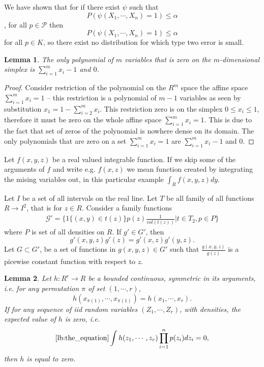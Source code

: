 \documentclass{article}
\newtheorem{lemma}{Lemma}
\begin{document}
We have shown that for if there exist $\psi$ such that 
$$P(\psi(X_1,\cdots, X_n) = 1) \leq \alpha$$,
for all $p \in \mathcal{P}$ then 
\[
 P(\psi(X_1,\cdots, X_n) = 1) \leq \alpha
\]
for all $p \in K$, so there exist no distribution for which type two error is small.  

\begin{lemma}
\label{lem:aha}
 The only polynomial of $m$ variables that is zero on the $m$-dimensional simplex is $\sum_{i=1}^m x_i-1$ and $0$.  
\end{lemma}
\begin{proof}
Consider restriction of the polynomial on the $R^m$ space  the affine space $\sum_{i=1}^m x_i=1$  -- this restriction is a polynomial of $m-1$ variables as seen by substitution $x_1 = 1 -\sum_{i=2}^m x_i$. This restriction zero is on the simplex $0 \leq x_i \leq 1$, therefore it must be zero on the whole affine space  $\sum_{i=1}^m x_i=1$. This is due to the fact that set of zeros of the polynomial is nowhere dense on its domain. The only polynomials that are zero on a set $\sum_{i=1}^m x_i=1$ are $\sum_{i=1}^m x_i-1$ and $0$.   
\end{proof}



Let $f(x,y,z)$ be a real valued integrable function. If we skip some of the arguments of $f$ and write e.g. $f(x,z)$ we mean function created by integrating the mising variables out, in this particular example $\int_{R} f(x,y,z) dy$.  


Let $I$ be a set of all intervals on the real line. Let  $T$ be all family of all functions $R \to I^2$, that is for $z \in R$. Consider a family functions
\begin{align}
 \mathcal G' = \bigg \{ 1\{ (x,y) \in t(z) \}p(z) \frac{1}{vol(t(z))} | t \in T_2 , p \in P  \bigg \} 
\end{align}
where $P$ is set of all densities on $R$. If $g' \in G'$, then 
\[
g'(x,y,z) g'(z) = g'(x,z) g'(y,z). 
\]
Let $G \subset G'$, be a set of functions in $g(x,y,z) \in G'$ such that $\frac{g(x,y,z)}{g(z)}$ is a picewise constant function with respect to $z$.


\begin{lemma}
\label{the:Lemma}
Let $h: R^r \to R$ be a bounded  continuous, symmetric in its arguments, i.e. for any permutation $\pi$ of set $(1,\cdots,r)$,
$$
h(x_{\pi(1)},\cdots,x_{\pi(1)}) = h(x_1,\cdots,x_r).   
$$
If for any sequence of iid random variables $(Z_1,\cdots,Z_r)$, with densities, the expected value of $h$ is zero, i.e.
\begin{align}
\ref{lb:the_equation}
\int h(z_1,\cdots,z_r) \prod_{i=1}^n p(z_i) d z_i = 0, 
\end{align}
then $h$ is equal to zero.
\end{lemma}
\end{document}
